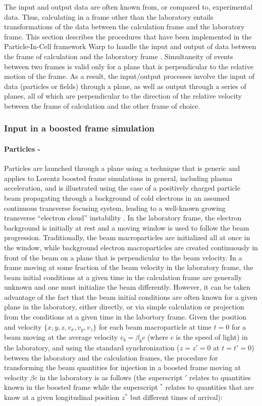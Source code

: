 The input and output data are often known from, or compared to, experimental data. Thus, calculating in
a frame other than the laboratory entails transformations of the data between the calculation frame and the laboratory
frame. This section describes the procedures that have been implemented in the Particle-In-Cell framework Warp \cite{Warp} to handle the input and output of data between the frame of calculation and the laboratory frame \cite{Vaypop2011}. Simultaneity of events between two frames is valid only for a plane that is perpendicular to the relative motion of the frame. As a result, the input/output processes involve the input of data (particles or fields) through a plane, as well as output through a series of planes, all of which are perpendicular to the direction of the relative velocity between the frame of calculation and the other frame of choice.

\subsubsection{Input in a boosted frame simulation}
\paragraph{Particles - }
Particles are launched through a plane using a technique that is generic and applies to Lorentz boosted frame simulations in general, including plasma acceleration, and is illustrated using the case of a positively charged particle beam propagating through a background of cold electrons in an assumed continuous transverse focusing system, leading to a well-known growing transverse ``electron cloud'' instability  \cite{Vayprl07}. In the laboratory frame, the electron background is initially at rest and a moving window is used to follow the beam progression. Traditionally, the beam macroparticles are initialized all at once in the window, while background electron macroparticles are created continuously in front of the beam on a plane that is perpendicular to the beam velocity. In a frame moving at some fraction of the beam velocity in the laboratory frame, the beam initial conditions at a given time in the calculation frame are generally unknown and one must initialize the beam differently. However, it can be taken advantage of the fact that the beam initial conditions are often known for a given plane in the laboratory, either directly, or via simple calculation or projection from the conditions at a given time in the labortory frame. Given the position and velocity $\{x,y,z,v_x,v_y,v_z\}$ for each beam macroparticle at time $t=0$ for a beam moving at the average velocity $v_b=\beta_b c$ (where $c$ is the speed of light) in the laboratory, and using the standard synchronization ($z=z'=0$ at $t=t'=0$) between the laboratory and the calculation frames, the procedure for transforming the beam quantities for injection in a boosted frame moving at velocity $\beta c$ in the laboratory is as follows (the superscript $'$ relates to quantities known in the boosted frame while the superscript $^*$ relates to quantities that are know at a given longitudinal position $z^*$ but different times of arrival):


